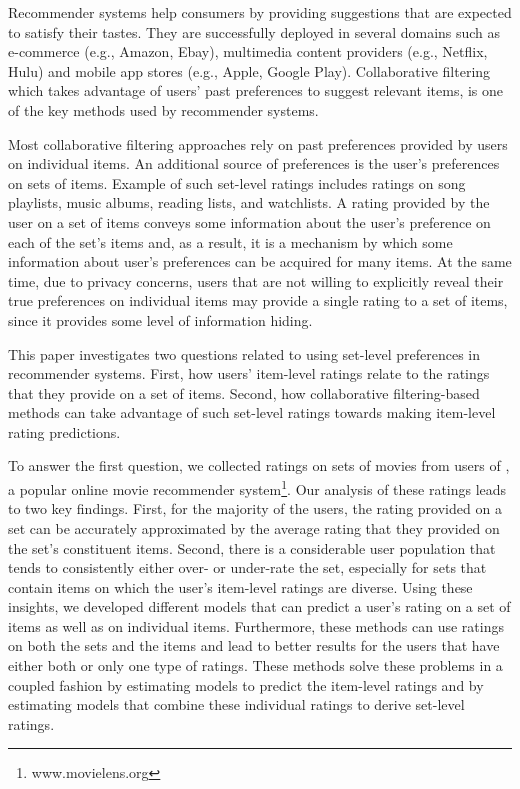 

Recommender systems help consumers by providing suggestions that are
expected to satisfy their tastes. They are successfully  deployed in several domains
such as e-commerce (e.g., Amazon, Ebay), multimedia content providers (e.g., Netflix,
Hulu) and mobile app stores (e.g., Apple, Google Play).
Collaborative filtering~\cite{r30,koren2009matrix} which takes advantage of users' past preferences
to suggest relevant items, is one of the key methods
used by recommender systems.


Most collaborative filtering approaches rely on past preferences provided by
users on individual items.
An additional source of preferences is the user's preferences on sets of items.
Example of such set-level ratings includes
ratings on song playlists, music albums, reading lists,
and watchlists. 
A rating provided by the user on a set of items conveys some information about the
user's preference on each of the set's items and, as a result, it is a
mechanism by which some information about user's preferences can be acquired for
many items.
At the same time, due to privacy concerns, users that are not willing to
explicitly reveal their true preferences on individual items may provide a single
rating to a set of items, since it provides some level of information hiding.

This paper investigates two questions related to using set-level preferences
in recommender systems. 
First, how users' item-level ratings relate to the
ratings that they provide on a set of items. Second, how collaborative
filtering-based methods
can take advantage of such set-level ratings towards making item-level rating
predictions.


To answer the first question, we collected ratings on sets
of movies from users of \ML, a popular online movie recommender
system\footnote{www.movielens.org}. 
Our analysis of these ratings leads to two key findings. First, for the majority
of the users, the rating provided on a set can be accurately approximated by the
average rating that they provided on the set's constituent items. Second, there
is a considerable user population that tends to consistently either over- or
under-rate the set, especially for sets that contain items on which the user's
item-level ratings are diverse.
Using these insights, we developed different  models that can predict
a user's rating on a set of items as well as on individual items. 
Furthermore, these methods can use ratings on both the sets and the items and
lead to better results for the users that have either both or only one type of
ratings.
These methods solve
these problems in a coupled fashion by estimating models to predict the item-level
ratings and by estimating models that combine these individual ratings to derive
set-level ratings.



